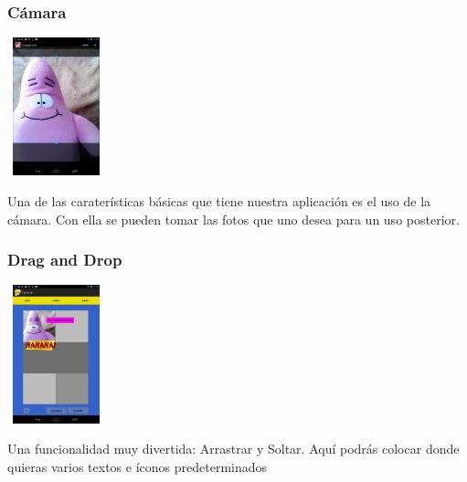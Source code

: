 \documentclass[utf8]{beamer}
\begin{document}
\begin{frame}
  \frametitle{Cámara}
 

  	\begin{center}
		\begingroup
			\includegraphics[height=4cm,width=2.8205cm]{imagenes/camaraft1.png}
		\endgroup
	\end{center}

  \begin{block}{}
Una de las caraterísticas básicas que tiene nuestra aplicación es el uso de la cámara. Con ella se pueden tomar las fotos que uno desea para un uso posterior.
  \end{block}

\end{frame}





\begin{frame}
  \frametitle{Drag and Drop}
 

  	\begin{center}
		\begingroup
			\includegraphics[height=4cm,width=2.8205cm]{imagenes/drag.png}
		\endgroup
	\end{center}

  \begin{block}{}
Una funcionalidad muy divertida: Arrastrar y Soltar. Aquí podrás colocar donde quieras varios textos e íconos predeterminados 
  \end{block}

\end{frame}
\end{document}
